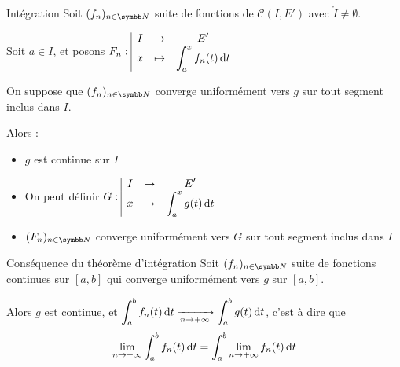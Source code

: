 \begin{theoreme}{Intégration}{}
    Soit $(f_n)_{n \in \N}$ suite de fonctions de $\mathscr C (I, E')$ avec
    $\mathring I \neq \emptyset$.

    Soit $a \in I$, et posons $F_n: \space \begin{array}{|ccc} \displaystyle I & \to & \displaystyle E' \\ \displaystyle x & \mapsto & \displaystyle \int_a^x f_n(t) \,\mathrm{d}t \end{array}$

    On suppose que $(f_n)_{n \in \N}$ converge uniformément vers $g$ 
    sur tout segment inclus dans $I$.

    Alors : 
    \begin{itemize}
        \item $g$ est continue sur $I$
        \item On peut définir $G: \space \begin{array}{|ccc} \displaystyle I & \to & \displaystyle E' \\ \displaystyle x & \mapsto & \displaystyle \int_a^x g(t) \,\mathrm{d}t \end{array}$
        \item $(F_n)_{n \in \N}$ converge uniformément vers $G$ sur tout segment inclus dans $I$
    \end{itemize}
\end{theoreme}

\begin{corollaire}{Conséquence du théorème d'intégration}{}
    Soit $(f_n)_{n \in \N}$ suite de fonctions continues sur 
    $[a, b]$ qui converge uniformément vers $g$ sur $[a, b]$. 
    
    Alors $g$ est continue, et
    $\displaystyle \int_a^b f_n(t) \,\mathrm{d}t \xrightarrow[n\to +\infty]{} \int_a^b g(t) \,\mathrm{d}t$, c'est à dire 
    que $$\lim_{n \to +\infty} \int_a^b f_n(t) \,\mathrm{d}t = \int_a^b \lim_{n \to +\infty} f_n(t) \,\mathrm{d}t$$ 
\end{corollaire}


